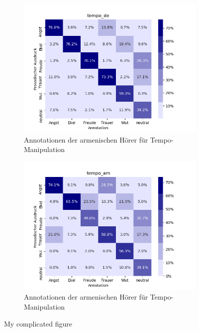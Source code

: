 \documentclass[11pt,a4paper,headsepline,twoside,toc=bibliography]{scrreprt}
\begin{document}
\begin{figure}[t!]
	\medskip
	\begin{subfigure}{0.48\textwidth}
		\includegraphics[width=\linewidth]{plots/heatmap/conf_tempo_de.png}
		\caption{Annotationen der armenischen Hörer für Tempo-Manipulation} \label{fig:conf_tempo_de}
	\end{subfigure}\hspace*{\fill}
	\begin{subfigure}{0.48\textwidth}
		\includegraphics[width=\linewidth]{plots/heatmap/conf_tempo_am.png}
		\caption{Annotationen der armenischen Hörer für Tempo-Manipulation} \label{fig:conf_tempo_am}
	\end{subfigure}
	
	\caption{My complicated figure} \label{fig:confusion_heatmap}
\end{figure}
\end{document}
